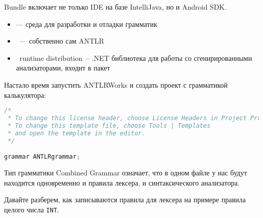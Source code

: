 
\bigskip
Bundle включает не только IDE на базе IntelliJava, но и Android SDK.

\secup


\begin{itemize}[nosep]
\item {} --- среда для разработки и отладки грамматик
\item {}\ --- собственно сам ANTLR
\item {} \cs\ runtime distribution\ -- .NET библиотека 
для работы со сгенирированными анализаторами, входит в пакет 
\end{itemize}


Настало время запустить ANTLRWorks и создать проект с грамматикой калькулятора:





\begin{lstlisting}[title=ANTLRgrammar.g4,language=java]
/*
 * To change this license header, choose License Headers in Project Properties.
 * To change this template file, choose Tools | Templates
 * and open the template in the editor.
 */

grammar ANTLRgrammar;
\end{lstlisting}

Тип грамматики Combined Grammar означает, что в одном файле у нас будут 
находится одновременно и правила лексера, и синтаксического анализатора.

Давайте разберем, как записываются правила для лексера на примере правила
целого числа \verb|INT|.

\secup
